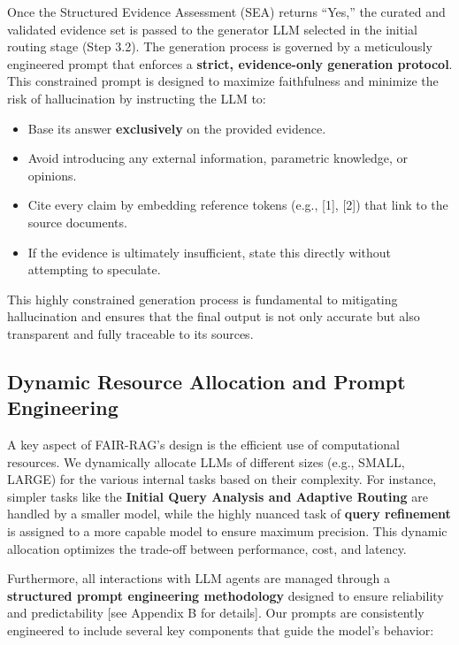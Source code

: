 \documentclass[11pt]{article}
\begin{document}
Once the Structured Evidence Assessment (SEA) returns ``Yes,'' the curated and validated evidence set is passed to the generator LLM selected in the initial routing stage (Step 3.2). The generation process is governed by a meticulously engineered prompt that enforces a \textbf{strict, evidence-only generation protocol}. This constrained prompt is designed to maximize faithfulness and minimize the risk of hallucination by instructing the LLM to:

\begin{itemize}
    \item Base its answer \textbf{exclusively} on the provided evidence.
    \item Avoid introducing any external information, parametric knowledge, or opinions.
    \item Cite every claim by embedding reference tokens (e.g., [1], [2]) that link to the source documents.
    \item If the evidence is ultimately insufficient, state this directly without attempting to speculate.
\end{itemize}

This highly constrained generation process is fundamental to mitigating hallucination and ensures that the final output is not only accurate but also transparent and fully traceable to its sources. 

\subsection{Dynamic Resource Allocation and Prompt Engineering}

A key aspect of FAIR-RAG's design is the efficient use of computational resources. We dynamically allocate LLMs of different sizes (e.g., SMALL, LARGE) for the various internal tasks based on their complexity. For instance, simpler tasks like the \textbf{Initial Query Analysis and Adaptive Routing} are handled by a smaller model, while the highly nuanced task of \textbf{query refinement} is assigned to a more capable model to ensure maximum precision. This dynamic allocation optimizes the trade-off between performance, cost, and latency.

Furthermore, all interactions with LLM agents are managed through a \textbf{structured prompt engineering methodology} designed to ensure reliability and predictability [see Appendix B for details]. Our prompts are consistently engineered to include several key components that guide the model's behavior:
\end{document}
